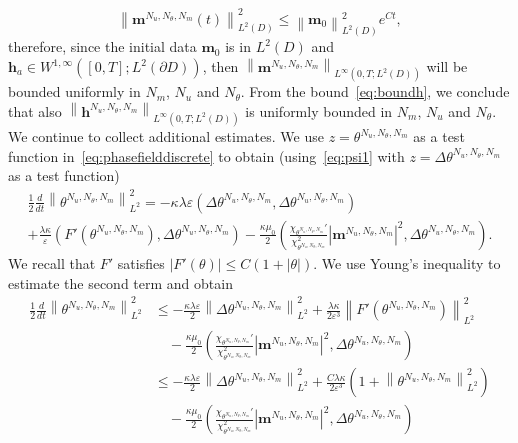 \documentclass[10pt,letterpaper,twoside]{amsart}
\theoremstyle{definition}{\newtheorem{definition}[lemma]{Definition}}
\theoremstyle{note}{\newtheorem{claim}{Claim}[section]
\newtheorem*{claim*}{Claim}}
\numberwithin{equation}{section}
\newcommand{\dom}{D}
\newcommand{\norm}[1]{\left\| #1 \right\|}
\newcommand{\bm}{\mathbf{m}}
\newcommand{\bma}{\mathbf{m}^{N_u,N_\theta,N_m}}
\newcommand{\bha}{\mathbf{h}^{N_u,N_\theta,N_m}}
\newcommand{\tha}{\theta^{N_u,N_\theta,N_m}}
\newcommand{\bh}{\mathbf{h}}
\begin{document}
\begin{equation}\label{eq:uniformmbound}
	\norm{\bma(t)}_{L^2(\dom)}^2 \leq \norm{\bm_0}_{L^2(\dom)}^2 e^{Ct},
\end{equation}
therefore, since the initial data $\bm_0$ is in $L^2(\dom)$ and $\bh_a\in W^{1,\infty}([0,T];L^2(\partial\dom))$, then $\norm{\bma}_{L^\infty(0,T;L^2(\dom))}$ will be bounded uniformly in $N_m$, $N_u$ and $N_\theta$. From the bound~\eqref{eq:boundh}, we conclude that also $\norm{\bha}_{L^\infty(0,T;L^2(\dom))}$ is uniformly bounded in   $N_m$, $N_u$ and $N_\theta$. 
We continue to collect additional estimates. 
We use $z=\tha$ as a test function in~\eqref{eq:phasefielddiscrete} to obtain (using~\eqref{eq:psi1} with $z=\Delta \tha$ as a test function)
\begin{multline*}
	\frac12\frac{d}{dt}\norm{\tha}_{L^2}^2= -\kappa \lambda\varepsilon(\Delta\tha,\Delta\tha)\\
	+ \frac{\lambda\kappa}{\varepsilon}(F'(\tha),\Delta\tha) - \frac{\kappa\mu_0}{2}\left(\frac{\chi_{\tha}'}{\chi_{\tha}^2} |\bma|^2,\Delta\tha\right).
\end{multline*}
We recall that $F'$ satisfies $|F'(\theta)|\leq C(1+|\theta|)$.
We use Young's inequality to estimate the second term and obtain
\begin{equation*}
	\begin{split}
	\frac12\frac{d}{dt}\norm{\tha}_{L^2}^2&\leq  -\frac{\kappa\lambda \varepsilon}{2}\norm{\Delta\tha}_{L^2}^2+ \frac{\lambda\kappa}{2\varepsilon^3}\norm{F'(\tha)}_{L^2}^2 \\
	&\quad - \frac{\kappa\mu_0}{2}\left(\frac{\chi_{\tha}'}{\chi_{\tha}^2} |\bma|^2,\Delta\tha\right)\\
	&\leq  -\frac{\kappa \lambda\varepsilon}{2}\norm{\Delta\tha}_{L^2}^2+ \frac{C\lambda\kappa}{2\varepsilon^3}(1+\norm{\tha}_{L^2}^2 )\\
	&\quad - \frac{\kappa\mu_0}{2}\left(\frac{\chi_{\tha}'}{\chi_{\tha}^2} |\bma|^2,\Delta\tha\right)
	\end{split}
\end{equation*}
\end{document}
